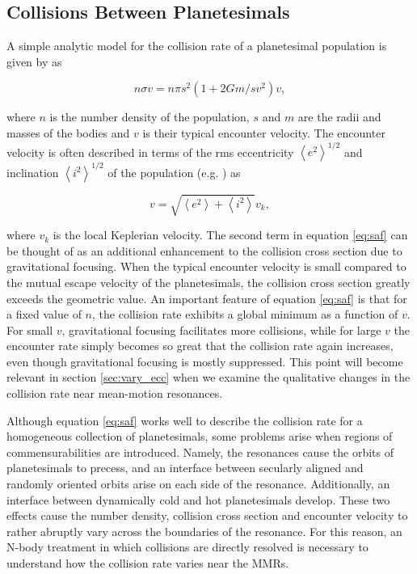\subsection{Collisions Between Planetesimals}\label{sec:colleq}

A simple analytic model for the collision rate of a planetesimal population is given by \cite{safronov69} as

\begin{equation}\label{eq:saf}
	n \sigma v = n \pi s^{2} \left( 1 + 2 G m / s v^{2} \right) v,
\end{equation}

\noindent where $n$ is the number density of the population, $s$ and $m$ are the radii and masses of the bodies and $v$ is 
their typical encounter velocity. The encounter velocity is often described in terms of the rms eccentricity 
$\left<e^{2}\right>^{1/2}$ and inclination $\left<i^{2}\right>^{1/2}$ of the population (e.g. \cite{lissauer93}) as

\begin{equation}\label{eq:eccincvel}
	v = \sqrt{\left< e^{2} \right> + \left< i^{2} \right>} v_{k},
\end{equation}

\noindent where $v_{k}$ is the local Keplerian velocity. The second term in equation \ref{eq:saf} can be thought of as an 
additional enhancement to the collision cross section due to gravitational focusing. When the typical encounter velocity is small 
compared to the mutual escape velocity of the planetesimals, the collision cross section greatly exceeds the geometric value. An 
important feature of equation \ref{eq:saf} is that for a fixed value of $n$, the collision rate exhibits a global minimum as a function 
of $v$. For small $v$, gravitational focusing facilitates more collisions, while for large $v$ the encounter rate simply becomes so 
great that the collision rate again increases, even though gravitational focusing is mostly suppressed. This point will become 
relevant in section \ref{sec:vary_ecc} when we examine the qualitative changes in the collision rate near mean-motion 
resonances.

Although equation \ref{eq:saf} works well to describe the collision rate for a homogeneous collection of planetesimals, some 
problems arise when regions of commensurabilities are introduced. Namely, the resonances cause the orbits of planetesimals to 
precess, and an interface between secularly aligned and randomly oriented orbits arise on each side of the resonance. 
Additionally, an interface between dynamically cold and hot planetesimals develop. These two effects cause the number density, 
collision cross section and encounter velocity to rather abruptly vary across the boundaries of the resonance. For this reason, an 
N-body treatment in which collisions are directly resolved is necessary to understand how the collision rate varies near the 
MMRs.

